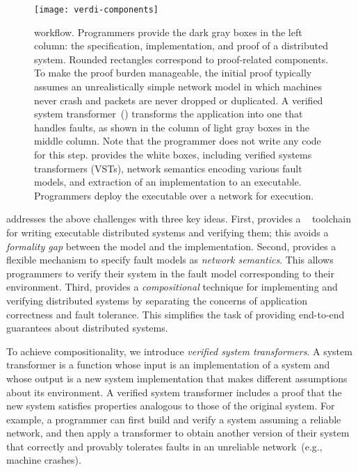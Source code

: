 \begin{figure*}
\texttt{[image: verdi-components]}

\caption{\Verdi workflow.  Programmers provide the dark gray boxes in
  the left column: the specification, implementation, and proof of a
  distributed system.  Rounded rectangles correspond to proof-related
  components.  To make the proof burden manageable, the initial proof
  typically assumes an unrealistically simple network model in which
  machines never crash and packets are never dropped or duplicated.  A
  verified system transformer~(\VST) transforms the application into
  one that handles faults, as shown in the column of light gray boxes
  in the middle column.  Note that the programmer does not write any
  code for this step. \Verdi provides the white boxes, including
  verified systems transformers (VSTs), network semantics encoding
  various fault models, and extraction of an implementation to an
  executable.  Programmers deploy the executable over a network for
  execution.}

\label{fig:verdi-components}
\end{figure*}

\Verdi addresses the above challenges with three key ideas.
%
First, \Verdi provides a \Coq~\cite{Coq} toolchain for writing executable distributed
systems and verifying them; this avoids a \emph{formality gap} between the
model and the implementation.
%
Second, \Verdi provides a flexible mechanism to specify fault models as
\emph{network semantics}.
%
This allows programmers to verify their system in the fault model
corresponding to their environment.
%
Third, \Verdi provides a \emph{compositional} technique for
implementing and verifying distributed systems by separating the
concerns of application correctness and fault tolerance.
%
This simplifies the task of providing end-to-end guarantees about
distributed systems.

To achieve compositionality, we introduce \textit{verified
system transformers}.
%
A system transformer is a function whose input is an
implementation of a system and whose output is a new system implementation that
makes different assumptions about its environment.
%
A verified system transformer
includes a proof that the new system
satisfies properties analogous to those of the original system.
%
For example, a \Verdi programmer can first build and verify a system
assuming a reliable network, and then apply a transformer to obtain
another version of their system that correctly and provably
tolerates faults in an unreliable network~(e.g., machine crashes).

